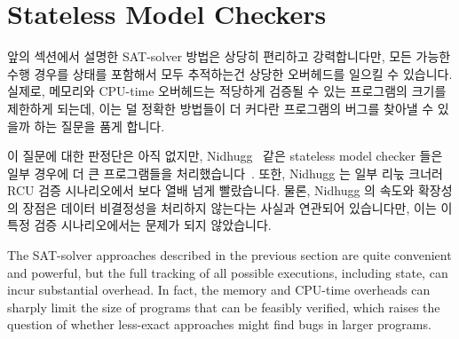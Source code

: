 
\section{Stateless Model Checkers}
\label{sec:formal:Stateless Model Checkers}

앞의 섹션에서 설명한 SAT-solver 방법은 상당히 편리하고 강력합니다만, 모든
가능한 수행 경우를 상태를 포함해서 모두 추적하는건 상당한 오버헤드를 일으킬 수
있습니다.
실제로, 메모리와 CPU-time 오버헤드는 적당하게 검증될 수 있는 프로그램의 크기를
제한하게 되는데, 이는 덜 정확한 방법들이 더 커다란 프로그램의 버그를 찾아낼 수
있을까 하는 질문을 품게 합니다.

이 질문에 대한 판정단은 아직 없지만, Nidhugg~\cite{CarlLeonardsson2014Nidhugg}
같은 stateless model checker 들은 일부 경우에 더 큰 프로그램들을
처리했습니다~\cite{SMC-TreeRCU}.
또한, Nidhugg 는 일부 리눇 크너러 RCU 검증 시나리오에서  보다 열배
넘게 빨랐습니다.
물론, Nidhugg 의 속도와 확장성의 장점은 데이터 비결정성을 처리하지 않는다는
사실과 연관되어 있습니다만, 이는 이 특정 검증 시나리오에서는 문제가 되지
않았습니다.
\iffalse

The SAT-solver approaches described in the previous section are quite
convenient and powerful, but the full tracking of all possible
executions, including state, can incur substantial overhead.
In fact, the memory and CPU-time overheads can sharply limit the size
of programs that can be feasibly verified, which raises the question
of whether less-exact approaches might find bugs in larger programs.

